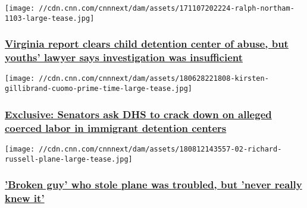 \href{/2018/08/14/us/virginia-clears-shenandoah-detention-center-abuse-allegations-invs/index.html}{}

\texttt{[image: //cdn.cnn.com/cnnnext/dam/assets/171107202224-ralph-northam-1103-large-tease.jpg]}

\hypertarget{virginia-report-clears-child-detention-center-of-abuse-but-youths-lawyer-says-investigation-was-insufficient}{%
\subsubsection{\texorpdfstring{\href{/2018/08/14/us/virginia-clears-shenandoah-detention-center-abuse-allegations-invs/index.html}{Virginia
report clears child detention center of abuse, but youths' lawyer says
investigation was
insufficient}}{Virginia report clears child detention center of abuse, but youths' lawyer says investigation was insufficient}}\label{virginia-report-clears-child-detention-center-of-abuse-but-youths-lawyer-says-investigation-was-insufficient}}

\href{/2018/08/13/us/senators-letter-dhs-ice-detention-work-program-invs/index.html}{}

\texttt{[image: //cdn.cnn.com/cnnnext/dam/assets/180628221808-kirsten-gillibrand-cuomo-prime-time-large-tease.jpg]}

\hypertarget{exclusive-senators-ask-dhs-to-crack-down-on-alleged-coerced-labor-in-immigrant-detention-centers-}{%
\subsubsection{\texorpdfstring{\href{/2018/08/13/us/senators-letter-dhs-ice-detention-work-program-invs/index.html}{Exclusive:
Senators ask DHS to crack down on alleged coerced labor in immigrant
detention centers
}}{Exclusive: Senators ask DHS to crack down on alleged coerced labor in immigrant detention centers }}\label{exclusive-senators-ask-dhs-to-crack-down-on-alleged-coerced-labor-in-immigrant-detention-centers-}}

\href{/2018/08/13/us/seattle-plane-crash-pilot-invs/index.html}{}

\texttt{[image: //cdn.cnn.com/cnnnext/dam/assets/180812143557-02-richard-russell-plane-large-tease.jpg]}

\hypertarget{broken-guy-who-stole-plane-was-troubled-but-never-really-knew-it}{%
\subsubsection{\texorpdfstring{\href{/2018/08/13/us/seattle-plane-crash-pilot-invs/index.html}{'Broken
guy' who stole plane was troubled, but 'never really knew
it'}}{'Broken guy' who stole plane was troubled, but 'never really knew it'}}\label{broken-guy-who-stole-plane-was-troubled-but-never-really-knew-it}}

